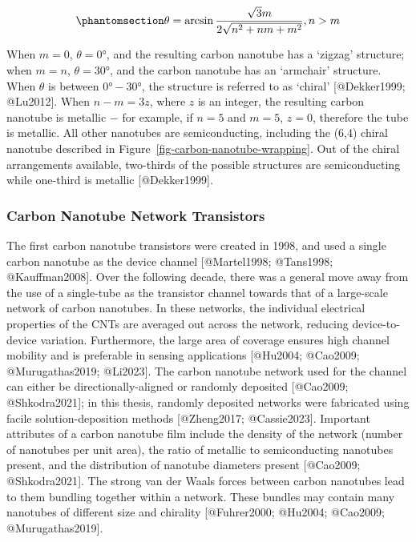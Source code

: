 \documentclass[
  letterpaper,
  DIV=11,
  numbers=noendperiod]{scrartcl}
\begin{document}
\begin{equation}\phantomsection\label{eq-chiral-angle}{
\theta = \arcsin\frac{\sqrt{3}m}{2\sqrt{n^2+nm+m^2}}, \space n > m
}\end{equation}

When \(m=0\), \(\theta = 0°\), and the resulting carbon nanotube has a
`zigzag' structure; when \(m=n\), \(\theta = 30°\), and the carbon
nanotube has an `armchair' structure. When \(\theta\) is between
\(0°-30°\), the structure is referred to as `chiral' {[}@Dekker1999;
@Lu2012{]}. When \(n-m=3z\), where \(z\) is an integer, the resulting
carbon nanotube is metallic \(-\) for example, if \(n=5\) and \(m=5\),
\(z=0\), therefore the tube is metallic. All other nanotubes are
semiconducting, including the (6,4) chiral nanotube described in
Figure~\ref{fig-carbon-nanotube-wrapping}. Out of the chiral
arrangements available, two-thirds of the possible structures are
semiconducting while one-third is metallic {[}@Dekker1999{]}.

\subsubsection{Carbon Nanotube Network
Transistors}\label{sec-cnt-network-details}

The first carbon nanotube transistors were created in 1998, and used a
single carbon nanotube as the device channel {[}@Martel1998; @Tans1998;
@Kauffman2008{]}. Over the following decade, there was a general move
away from the use of a single-tube as the transistor channel towards
that of a large-scale network of carbon nanotubes. In these networks,
the individual electrical properties of the CNTs are averaged out across
the network, reducing device-to-device variation. Furthermore, the large
area of coverage ensures high channel mobility and is preferable in
sensing applications {[}@Hu2004; @Cao2009; @Murugathas2019; @Li2023{]}.
The carbon nanotube network used for the channel can either be
directionally-aligned or randomly deposited {[}@Cao2009;
@Shkodra2021{]}; in this thesis, randomly deposited networks were
fabricated using facile solution-deposition methods {[}@Zheng2017;
@Cassie2023{]}. Important attributes of a carbon nanotube film include
the density of the network (number of nanotubes per unit area), the
ratio of metallic to semiconducting nanotubes present, and the
distribution of nanotube diameters present {[}@Cao2009; @Shkodra2021{]}.
The strong van der Waals forces between carbon nanotubes lead to them
bundling together within a network. These bundles may contain many
nanotubes of different size and chirality {[}@Fuhrer2000; @Hu2004;
@Cao2009; @Murugathas2019{]}.
\end{document}
